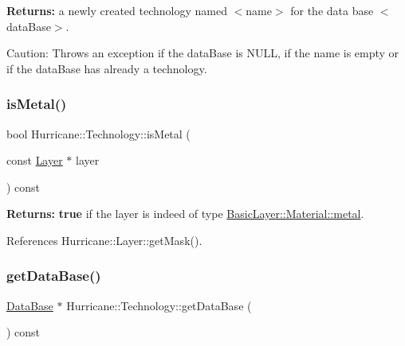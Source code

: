 {\bfseries Returns\+:} a newly created technology named {\ttfamily $<$name$>$} for the data base {\ttfamily $<$data\+Base$>$}.

\begin{DoxyParagraph}{Caution\+: Throws an exception if the {\ttfamily data\+Base} is {\ttfamily N\+U\+LL}, if the name is empty or if}
the {\ttfamily data\+Base} has already a technology. 
\end{DoxyParagraph}
\mbox{\label{classHurricane_1_1Technology_ae5590e455d35f76531a6feb0c0f111a2}} 
\subsubsection{\texorpdfstring{is\+Metal()}{isMetal()}}
{\footnotesize\ttfamily bool Hurricane\+::\+Technology\+::is\+Metal (\begin{DoxyParamCaption}\item[{const \mbox{\hyperlink{classHurricane_1_1Layer}{Layer}} $\ast$}]{layer }\end{DoxyParamCaption}) const\hspace{0.3cm}{\ttfamily [inline]}}

{\bfseries Returns\+:} {\bfseries true} if the {\ttfamily layer} is indeed of type \mbox{\hyperlink{classHurricane_1_1BasicLayer_1_1Material_a3e815440ad4b86b3569fa54ca06fc3e8a9f5ac52339b7bd9bbf7cdac468c51924}{Basic\+Layer\+::\+Material\+::metal}}. 

References Hurricane\+::\+Layer\+::get\+Mask().

\mbox{\label{classHurricane_1_1Technology_acf836e738fba14fa493b0e08148cc3ee}} 
\subsubsection{\texorpdfstring{get\+Data\+Base()}{getDataBase()}}
{\footnotesize\ttfamily \mbox{\hyperlink{classHurricane_1_1DataBase}{Data\+Base}} $\ast$ Hurricane\+::\+Technology\+::get\+Data\+Base (\begin{DoxyParamCaption}{ }\end{DoxyParamCaption}) const\hspace{0.3cm}{\ttfamily [inline]}}

